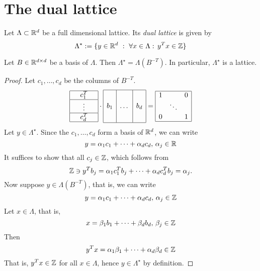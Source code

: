 \section{The dual lattice}

\begin{definition}
  Let $\Lambda \subset \mathbb{R}^d$ be a full dimensional lattice.
  Its \emph{dual lattice} is given by
  \[
    \Lambda^\star := \{ y \in \mathbb{R}^d ~:~ \forall x \in \Lambda:\, y^Tx \in \mathbb{Z} \}
  \]
\end{definition}

\begin{lemma}
  \label{lemma:dual-basis}
  Let $B \in \mathbb{R}^{d \times d}$ be a basis of $\Lambda$.
  Then $\Lambda^\star = \Lambda(B^{-T})$.
  In particular, $\Lambda^\star$ is a lattice.
\end{lemma}
\begin{proof}
  Let $c_1, \ldots, c_d$ be the columns of $B^{-T}$.
  \[
    \begin{array}{|c|}
      \hline \quad c_1^T \quad  \\\hline
      \vdots \\\hline
      c_d^T \\\hline
    \end{array}
    \cdot
    \begin{array}{|c|c|c|}
      \hline  & &\\[0.5em]
      b_1 & \dots & b_d \\
      & & \\[0.5em]\hline
    \end{array}
    =
    \begin{array}{|lcr|}
      \hline 1 & & 0 \\
       & \ddots & \\
      0 & & 1 \\\hline
    \end{array}
  \]
  Let $y \in \Lambda^\star$.
  Since the $c_1, \ldots, c_d$ form a basis of $\mathbb{R}^d$,
  we can write
  \[
    y = \alpha_1 c_1 + \dots + \alpha_d c_d,\, \alpha_j \in \mathbb{R}
  \]
  It suffices to show that all $c_j \in \mathbb{Z}$,
  which follows from
  \[
    \mathbb{Z} \ni y^T b_j = \alpha_1 c_1^T b_j + \dots + \alpha_d c_d^T b_j = \alpha_j.
  \]
  Now suppose $y \in \Lambda(B^{-T})$, that is,
  we can write
  \[
    y = \alpha_1 c_1 + \dots + \alpha_d c_d,\, \alpha_j \in \mathbb{Z}
  \]
  Let $x \in \Lambda$, that is,
  \[
    x = \beta_1 b_1 + \dots + \beta_d b_d,\, \beta_j \in \mathbb{Z}
  \]
  Then
  \[
    y^Tx = \alpha_1 \beta_1 + \dots + \alpha_d \beta_d \in \mathbb{Z}
  \]
  That is, $y^Tx \in \mathbb{Z}$ for all $x \in \Lambda$,
  hence $y \in \Lambda^\star$ by definition.
\end{proof}


